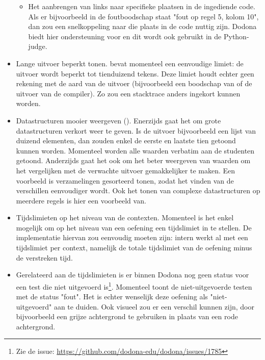 \begin{itemize}
\begin{itemize}
        \item Het aanbrengen van links naar specifieke plaatsen in de ingediende code.
        Als er bijvoorbeeld in de foutboodschap staat "fout op regel 5, kolom 10", dan zou een snelkoppeling naar die plaats in de code nuttig zijn.
        Dodona biedt hier ondersteuning voor en dit wordt ook gebruikt in de Python-judge.
    \end{itemize}
    \item Lange uitvoer beperkt tonen.
    \tested{} bevat momenteel een eenvoudige limiet: de uitvoer wordt beperkt tot tienduizend tekens.
    Deze limiet houdt echter geen rekening met de aard van de uitvoer (bijvoorbeeld een boodschap van \tested{} of de uitvoer van de compiler).
    Zo zou een stacktrace anders ingekort kunnen worden.
    \item Datastructuren mooier weergeven ().
    Enerzijds gaat het om grote datastructuren verkort weer te geven.
    Is de uitvoer bijvoorbeeld een lijst van duizend elementen, dan zouden enkel de eerste en laatste tien getoond kunnen worden.
    Momenteel worden alle waarden verbatim aan de studenten getoond.
    Anderzijds gaat het ook om het beter weergeven van waarden om het vergelijken met de verwachte uitvoer gemakkelijker te maken.
    Een voorbeeld is verzamelingen gesorteerd tonen, zodat het vinden van de verschillen eenvoudiger wordt.
    Ook het tonen van complexe datastructuren op meerdere regels is hier een voorbeeld van.
    \item Tijdslimieten op het niveau van de contexten.
    Momenteel is het enkel mogelijk om op het niveau van een oefening een tijdslimiet in te stellen.
    De implementatie hiervan zou eenvoudig moeten zijn: intern werkt \tested{} al met een tijdslimiet per context, namelijk de totale tijdslimiet van de oefening minus de verstreken tijd.
    \item Gerelateerd aan de tijdslimieten is er binnen Dodona nog geen status voor een test die niet uitgevoerd is\footnote{Zie de issue: \url{https://github.com/dodona-edu/dodona/issues/1785}}.
    Momenteel toont \tested{} de niet-uitgevoerde testen met de status "fout".
    Het is echter wenselijk deze oefening als "niet-uitgevoerd" aan te duiden.
    Ook visueel zou er een verschil kunnen zijn, door bijvoorbeeld een grijze achtergrond te gebruiken in plaats van een rode achtergrond.
\end{itemize}